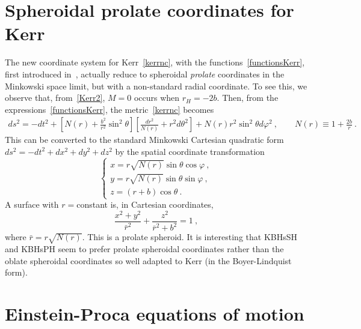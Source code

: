  \bigskip
 
\appendix

\section{Spheroidal prolate coordinates for Kerr}
\label{prolatecoordinates}
The new coordinate system for Kerr~\eqref{kerrnc}, with the functions~\eqref{functionsKerr}, first introduced in~\cite{Herdeiro:2015gia}, actually reduce to spheroidal \textit{prolate} coordinates in the Minkowski space limit, but with a non-standard radial coordinate. To see this, we observe that, from~\eqref{Kerr2}, $M=0$ occurs when $r_H=-2b$. Then, from the expressions~\eqref{functionsKerr}, the metric~\eqref{kerrnc} becomes
\begin{eqnarray}
ds^2=-dt^2+\left[N(r)+\frac{b^2}{r^2}\sin^2\theta\right]\left[\frac{dr^2}{N(r)}+r^2d\theta^2\right]
+N(r)r^2\sin^2\theta d\varphi^2 \ , \qquad N(r)\equiv 1+\frac{2b}{r} \ .
\end{eqnarray}
This can be converted to the standard Minkowski Cartesian quadratic form $ds^2=-dt^2+dx^2+dy^2+dz^2$ by the spatial coordinate transformation
\begin{equation}
\left\{
\begin{array}{l}
x=r\sqrt{N(r)}\sin\theta\cos\varphi \ , \\
y=r\sqrt{N(r)}\sin\theta\sin\varphi \ , \\
z=(r+b)\cos\theta \ .
\end{array}
\right.
\end{equation}
A surface with $r=$constant is, in Cartesian coordinates,
\begin{equation}
\frac{x^2+y^2}{\bar{r}^2}+\frac{z^2}{\bar{r}^2+b^2}=1 \ ,
\end{equation}
where $\bar{r}=r\sqrt{N(r)}$. This is a prolate spheroid. It is interesting that KBHsSH and KBHsPH seem to prefer prolate spheroidal coordinates rather than the oblate spheroidal coordinates so well adapted to Kerr (in the Boyer-Lindquist form).





\section{Einstein-Proca equations of motion}
\label{appendixb}



